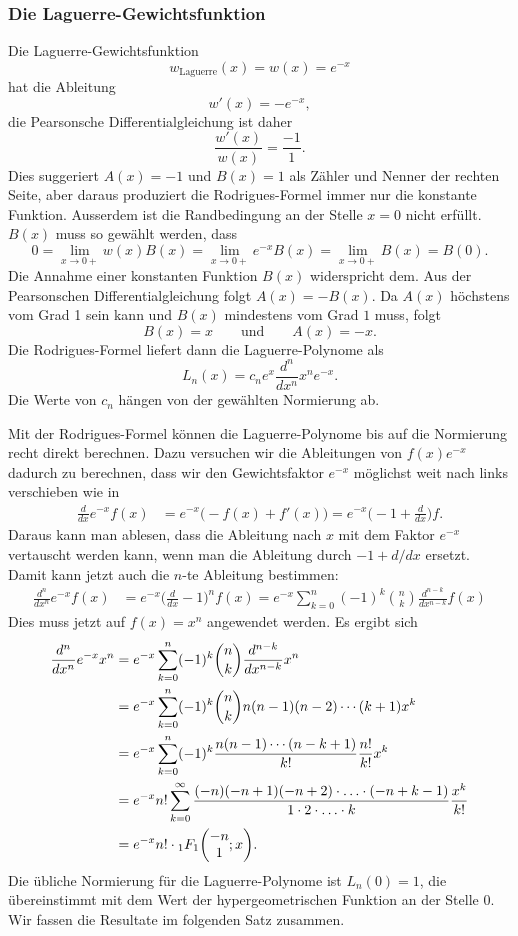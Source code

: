 \subsubsection{Die Laguerre-Gewichtsfunktion}
Die Laguerre-Gewichtsfunktion
\[
w_{\text{Laguerre}}(x)
=
w(x)
=
e^{-x}
\]
hat die Ableitung
\[
w'(x) = -e^{-x},
\]
die Pearsonsche Differentialgleichung ist daher
\[
\frac{w'(x)}{w(x)}=\frac{-1}{1}.
\]
Dies suggeriert $A(x)=-1$ und $B(x)=1$ als Zähler und Nenner der rechten
Seite, aber daraus produziert die Rodrigues-Formel immer nur die konstante
Funktion.
Ausserdem ist die Randbedingung an der Stelle $x=0$ nicht erfüllt.
$B(x)$ muss so gewählt werden, dass
\[
0
=
\lim_{x\to 0+} w(x)B(x)
= 
\lim_{x\to 0+} e^{-x}B(x)
=
\lim_{x\to 0+} B(x)
=
B(0).
\]
Die Annahme einer konstanten Funktion $B(x)$ widerspricht dem.
Aus der Pearsonschen Differentialgleichung folgt $A(x)=-B(x)$.
Da $A(x)$ höchstens vom Grad 1 sein kann und $B(x)$ mindestens
vom Grad $1$ muss, folgt
\[
B(x) = x
\qquad\text{und}\qquad
A(x) = -x.
\]
Die Rodrigues-Formel liefert dann die Laguerre-Polynome als
\[
L_n(x) = c_n e^x \frac{d^n}{dx^n} x^ne^{-x}.
\]
Die Werte von $c_n$ hängen von der gewählten Normierung ab.

Mit der Rodrigues-Formel können die Laguerre-Polynome bis auf
die Normierung recht direkt berechnen.
Dazu versuchen wir die Ableitungen von $f(x)e^{-x}$ dadurch zu
berechnen, dass wir den Gewichtsfaktor $e^{-x}$ möglichst weit
nach links verschieben wie in
\begin{align*}
\frac{d}{dx}
e^{-x}
f(x)
&=
e^{-x}
\bigl( -f(x) + f'(x) \bigr)
=
e^{-x}
\biggl( -1 + \frac{d}{dx}\biggr) f.
\end{align*}
Daraus kann man ablesen, dass die Ableitung nach $x$ mit dem Faktor
$e^{-x}$ vertauscht werden kann, wenn man die Ableitung durch
$-1+d/dx$ ersetzt.
Damit kann jetzt auch die $n$-te Ableitung bestimmen:
\begin{align*}
\frac{d^n}{dx^n}e^{-x}f(x)
&=
e^{-x} \biggl(\frac{d}{dx}-1\biggr)^n f(x)
=
e^{-x} \sum_{k=0}^n (-1)^{k}\binom{n}{k}\frac{d^{n-k}}{dx^{n-k}} f(x)
\end{align*}
Dies muss jetzt auf $f(x)=x^n$ angewendet werden.
Es ergibt sich
\begin{align*}
\frac{d^n}{dx^n}e^{-x}x^n
&=
e^{-x} \sum_{k=0}^n (-1)^{k}\binom{n}{k}\frac{d^{n-k}}{dx^{n-k}} x^n
\\
&=
e^{-x} \sum_{k=0}^n (-1)^{k}\binom{n}{k}
n(n-1)(n-2)\cdots (k+1)
x^k
\\
&=
e^{-x}
\sum_{k=0}^n (-1)^k \frac{n(n-1)\cdots(n-k+1)}{k!}
\frac{n!}{k!}
x^k
\\
&=
e^{-x} n!
\sum_{k=0}^\infty
\frac{(-n)(-n+1)(-n+2)\cdot\ldots\cdot (-n+k-1)}{1\cdot 2\cdot \ldots\cdot k}
\frac{x^k}{k!}
\\
&=
e^{-x} n!
\cdot
\mathstrut_1F_1\biggl(
\begin{matrix}-n\\1\end{matrix}; x
\biggr).
\end{align*}
Die übliche Normierung für die Laguerre-Polynome ist $L_n(0)=1$,
die übereinstimmt mit dem Wert der hypergeometrischen Funktion 
an der Stelle $0$.
Wir fassen die Resultate im folgenden Satz zusammen.

